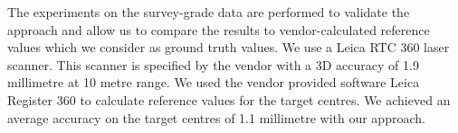 The experiments on the survey-grade data are performed to validate the approach and allow us to compare the results to vendor-calculated reference values which we consider as ground truth values. We use a Leica RTC 360 laser scanner. This scanner is specified by the vendor with a 3D accuracy of 1.9 millimetre at 10 metre range. We used the vendor provided software Leica Register 360 to calculate reference values for the target centres. We achieved an average accuracy on the target centres of 1.1 millimetre with our approach.   





